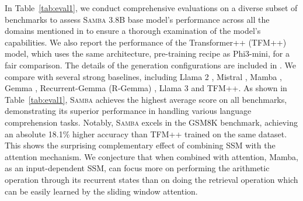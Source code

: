 \documentclass{article}
\begin{document}
 In Table~\ref{tab:eval1}, we conduct comprehensive evaluations on a diverse subset of benchmarks to assess \textsc{Samba} 3.8B base model's performance across all the domains mentioned in  to ensure a thorough examination of the model's capabilities.  We also report the performance of the Transformer++ (TFM++) model, which uses the same architecture, pre-training recipe as Phi3-mini, for a fair comparison. The details of the generation configurations are included in .
We compare with several strong baselines, including Llama 2 \citep{touvron2023llama}, Mistral \citep{jiang2023mistral}, Mamba \citep{gu2023mamba}, Gemma \citep{team2024gemma}, Recurrent-Gemma (R-Gemma) \citep{botev2024recurrentgemma}, Llama 3 \citep{llama3} and TFM++. As shown in Table~\ref{tab:eval1}, \textsc{Samba} achieves the highest average score on all benchmarks, demonstrating its superior performance in handling various language comprehension tasks. Notably, \textsc{Samba} excels in the GSM8K benchmark, achieving an absolute 18.1\% higher accuracy than TFM++ trained on the same dataset. This shows the surprising complementary effect of combining SSM with the attention mechanism. We conjecture that when combined with attention, Mamba, as an input-dependent SSM, can focus more on performing the arithmetic operation through its recurrent states than on doing the retrieval operation which can be easily learned by the sliding window attention.
\end{document}
